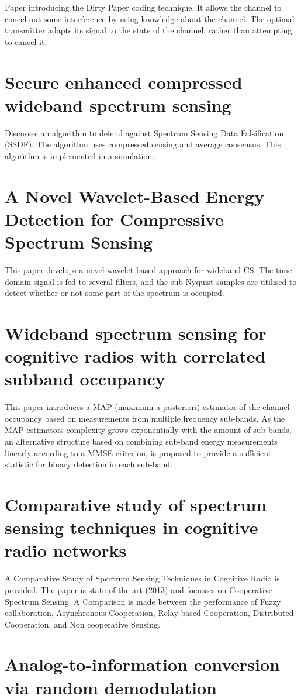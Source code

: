 \documentclass[report, oneside, a4paper, openany]{memoir}
\begin{document}
Paper introducing the Dirty Paper coding technique. It allows the channel to cancel out some interference by using knowledge about the channel. The optimal transmitter adapts its signal to the state of the channel, rather than attempting to cancel it.
\section{Secure enhanced compressed wideband spectrum sensing \cite{gang2012secure}}
Discusses an algorithm to defend against Spectrum Sensing Data Falsification (SSDF). The algorithm uses compressed sensing and average consensus. This algorithm is implemented in a simulation.
\section{A Novel Wavelet-Based Energy Detection for Compressive Spectrum Sensing \cite{han2013novel}}
This paper develops a novel-wavelet based approach for wideband CS. The time domain signal is fed to several filters, and the sub-Nyquist samples are utilised to detect whether or not some part of the spectrum is occupied.
\section{Wideband spectrum sensing for cognitive radios with correlated subband occupancy \cite{hossain2011wideband}}
This paper introduces a MAP (maximum a posteriori) estimator of the channel occupancy based on measurements from multiple frequency sub-bands.
As the MAP estimators complexity grows exponentially with the amount of sub-bands, an alternative structure based on combining sub-band energy measurements linearly according to a MMSE criterion, is proposed to provide a sufficient statistic for binary detection in each sub-band.
\section{Comparative study of spectrum sensing techniques in cognitive radio networks \cite{khan2013comparative}}
%
A Comparative Study of Spectrum Sensing Techniques in Cognitive Radio is provided. The paper is state of the art (2013) and focusses on Cooperative Spectrum Sensing. A Comparison is made between the performance of Fuzzy collaboration, Asynchronous Cooperation, Relay based Cooperation, Distributed Cooperation, and Non cooperative Sensing.
\section{Analog-to-information conversion via random demodulation \cite{kirolos2006analog}}
\end{document}
